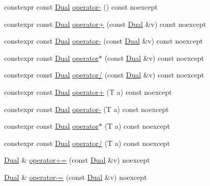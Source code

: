 \begin{DoxyCompactItemize}
\item 
constexpr const \mbox{\hyperlink{structmage_1_1_dual}{Dual}} \mbox{\hyperlink{structmage_1_1_dual_a6133625f8c136edf57f325a4879d76fa}{operator-\/}} () const noexcept
\item 
constexpr const \mbox{\hyperlink{structmage_1_1_dual}{Dual}} \mbox{\hyperlink{structmage_1_1_dual_ad1d4ab5eeb0b2a38b8f6871741dd4b79}{operator+}} (const \mbox{\hyperlink{structmage_1_1_dual}{Dual}} \&v) const noexcept
\item 
constexpr const \mbox{\hyperlink{structmage_1_1_dual}{Dual}} \mbox{\hyperlink{structmage_1_1_dual_a0071177bccbdd2882714c95b310ba00e}{operator-\/}} (const \mbox{\hyperlink{structmage_1_1_dual}{Dual}} \&v) const noexcept
\item 
constexpr const \mbox{\hyperlink{structmage_1_1_dual}{Dual}} \mbox{\hyperlink{structmage_1_1_dual_acc355c1f43db531500a1b017bc700e7c}{operator$\ast$}} (const \mbox{\hyperlink{structmage_1_1_dual}{Dual}} \&v) const noexcept
\item 
constexpr const \mbox{\hyperlink{structmage_1_1_dual}{Dual}} \mbox{\hyperlink{structmage_1_1_dual_acf8a212375f31cde83ba33b9d5a836e8}{operator/}} (const \mbox{\hyperlink{structmage_1_1_dual}{Dual}} \&v) const noexcept
\item 
constexpr const \mbox{\hyperlink{structmage_1_1_dual}{Dual}} \mbox{\hyperlink{structmage_1_1_dual_a954e200aa92be289de2f95e117c3f74d}{operator+}} (T a) const noexcept
\item 
constexpr const \mbox{\hyperlink{structmage_1_1_dual}{Dual}} \mbox{\hyperlink{structmage_1_1_dual_ae8837a79ce18241475771a1d381395bd}{operator-\/}} (T a) const noexcept
\item 
constexpr const \mbox{\hyperlink{structmage_1_1_dual}{Dual}} \mbox{\hyperlink{structmage_1_1_dual_a26be9e8612de0ca9d382b9ef9080c306}{operator$\ast$}} (T a) const noexcept
\item 
constexpr const \mbox{\hyperlink{structmage_1_1_dual}{Dual}} \mbox{\hyperlink{structmage_1_1_dual_ac6454648f6fc0822a16d6b7787a9a672}{operator/}} (T a) const noexcept
\item 
\mbox{\hyperlink{structmage_1_1_dual}{Dual}} \& \mbox{\hyperlink{structmage_1_1_dual_a0730d165f4a8b2fa34be6117646bf7e4}{operator+=}} (const \mbox{\hyperlink{structmage_1_1_dual}{Dual}} \&v) noexcept
\item 
\mbox{\hyperlink{structmage_1_1_dual}{Dual}} \& \mbox{\hyperlink{structmage_1_1_dual_afc7163000d7f36b6e5199233951e5975}{operator-\/=}} (const \mbox{\hyperlink{structmage_1_1_dual}{Dual}} \&v) noexcept

\end{DoxyCompactItemize}
